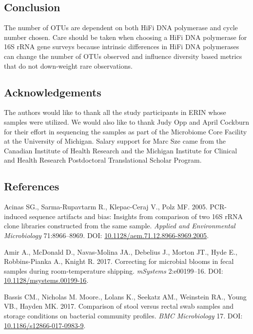 \documentclass[12pt,]{article}
\begin{document}
\newpage

\subsection{Conclusion}\label{conclusion}

The number of OTUs are dependent on both HiFi DNA polymerase and cycle
number chosen. Care should be taken when choosing a HiFi DNA polymerase
for 16S rRNA gene surveys because intrinsic differences in HiFi DNA
polymerases can change the number of OTUs observed and influence
diversity based metrics that do not down-weight rare observations.

\newpage

\subsection{Acknowledgements}\label{acknowledgements}

The authors would like to thank all the study participants in ERIN whose
samples were utilized. We would also like to thank Judy Opp and April
Cockburn for their effort in sequencing the samples as part of the
Microbiome Core Facility at the University of Michigan. Salary support
for Marc Sze came from the Canadian Institute of Health Research and the
Michigan Institute for Clinical and Health Research Postdoctoral
Translational Scholar Program.

\newpage

\subsection{References}\label{references}

\hypertarget{refs}{}
\hypertarget{ref-Acinas2005}{}
Acinas SG., Sarma-Rupavtarm R., Klepac-Ceraj V., Polz MF. 2005.
PCR-induced sequence artifacts and bias: Insights from comparison of two
16S rRNA clone libraries constructed from the same sample. \emph{Applied
and Environmental Microbiology} 71:8966--8969. DOI:
\href{https://doi.org/10.1128/aem.71.12.8966-8969.2005}{10.1128/aem.71.12.8966-8969.2005}.

\hypertarget{ref-Amir2017}{}
Amir A., McDonald D., Navas-Molina JA., Debelius J., Morton JT., Hyde
E., Robbins-Pianka A., Knight R. 2017. Correcting for microbial blooms
in fecal samples during room-temperature shipping. \emph{mSystems}
2:e00199--16. DOI:
\href{https://doi.org/10.1128/msystems.00199-16}{10.1128/msystems.00199-16}.

\hypertarget{ref-storage_Bassis_2017}{}
Bassis CM., Nicholas M. Moore., Lolans K., Seekatz AM., Weinstein RA.,
Young VB., Hayden MK. 2017. Comparison of stool versus rectal swab
samples and storage conditions on bacterial community profiles.
\emph{BMC Microbiology} 17. DOI:
\href{https://doi.org/10.1186/s12866-017-0983-9}{10.1186/s12866-017-0983-9}.
\end{document}
